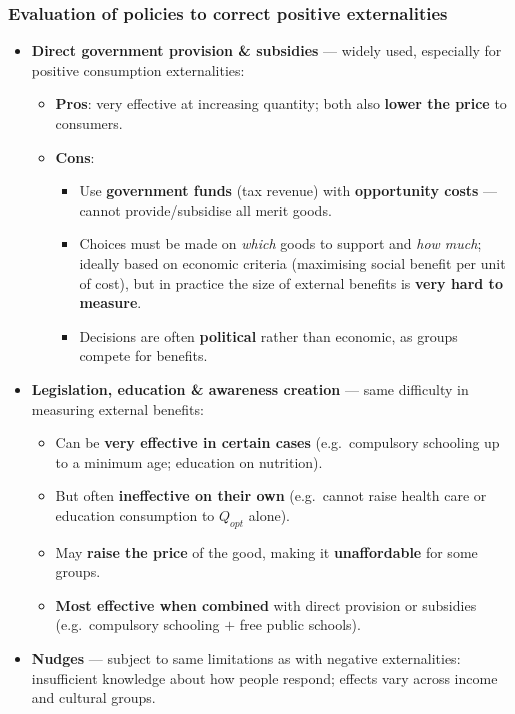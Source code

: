 \subsubsection*{Evaluation of policies to correct positive externalities}
\begin{itemize}
  \item \textbf{Direct government provision \& subsidies} --- widely used, especially for positive consumption externalities:
  \begin{itemize}
    \item \textbf{Pros}: very effective at increasing quantity; both also \textbf{lower the price} to consumers.
    \item \textbf{Cons}:
    \begin{itemize}
      \item Use \textbf{government funds} (tax revenue) with \textbf{opportunity costs} --- cannot provide/subsidise all merit goods.
      \item Choices must be made on \textit{which} goods to support and \textit{how much}; ideally based on economic criteria (maximising social benefit per unit of cost), but in practice the size of external benefits is \textbf{very hard to measure}.
      \item Decisions are often \textbf{political} rather than economic, as groups compete for benefits.
    \end{itemize}
  \end{itemize}
  \item \textbf{Legislation, education \& awareness creation} --- same difficulty in measuring external benefits:
  \begin{itemize}
    \item Can be \textbf{very effective in certain cases} (e.g.\ compulsory schooling up to a minimum age; education on nutrition).
    \item But often \textbf{ineffective on their own} (e.g.\ cannot raise health care or education consumption to $Q_{opt}$ alone).
    \item May \textbf{raise the price} of the good, making it \textbf{unaffordable} for some groups.
    \item \textbf{Most effective when combined} with direct provision or subsidies (e.g.\ compulsory schooling $+$ free public schools).
  \end{itemize}
  \item \textbf{Nudges} --- subject to same limitations as with negative externalities: insufficient knowledge about how people respond; effects vary across income and cultural groups.
\end{itemize}
